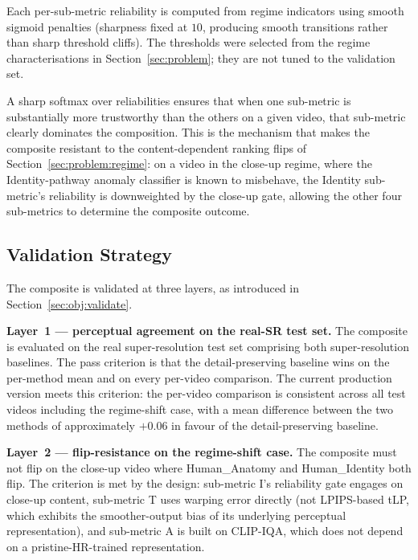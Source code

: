 Each per-sub-metric reliability is computed from regime indicators using smooth sigmoid
penalties (sharpness fixed at $10$, producing smooth transitions rather than sharp threshold
cliffs). The thresholds were selected from the regime characterisations in
Section~\ref{sec:problem}; they are not tuned to the validation set.

A sharp softmax over reliabilities ensures that when one sub-metric is substantially more
trustworthy than the others on a given video, that sub-metric clearly dominates the
composition. This is the mechanism that makes the composite resistant to the
content-dependent ranking flips of Section~\ref{sec:problem:regime}: on a video in the
close-up regime, where the Identity-pathway anomaly classifier is known to misbehave, the
Identity sub-metric's reliability is downweighted by the close-up gate, allowing the other
four sub-metrics to determine the composite outcome.

\subsection{Validation Strategy}

The composite is validated at three layers, as introduced in
Section~\ref{sec:obj:validate}.

\textbf{Layer~1 --- perceptual agreement on the real-SR test set.} The composite is
evaluated on the real super-resolution test set comprising both super-resolution baselines.
The pass criterion is that the detail-preserving baseline wins on the per-method mean and on
every per-video comparison. The current production version meets this criterion: the
per-video comparison is consistent across all test videos including the regime-shift case,
with a mean difference between the two methods of approximately $+0.06$ in favour of the
detail-preserving baseline.

\textbf{Layer~2 --- flip-resistance on the regime-shift case.} The composite must not flip
on the close-up video where Human\_Anatomy and Human\_Identity both flip. The criterion is
met by the design: sub-metric I's reliability gate engages on close-up content, sub-metric
T uses warping error directly (not LPIPS-based tLP, which exhibits the smoother-output bias
of its underlying perceptual representation), and sub-metric A is built on CLIP-IQA, which
does not depend on a pristine-HR-trained representation.


